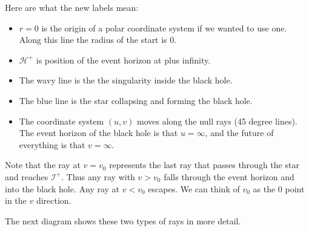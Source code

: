 \documentclass[12pt,border=3pt,tikz]{article}
\def\scri{\mathscr I}
\begin{document}
Here are what the new labels mean:

\begin{itemize}
\item $r=0$ is the origin of a polar coordinate system if we wanted to use one. Along this line the
radius of the start is $0$.
\item ${\mathcal H}^+$ is position of the event horizon at plus infinity.
\item The wavy line is the the singularity inside the black hole.
\item The blue line is the star collapsing and forming the black hole.
\item The coordinate system $(u,v)$ moves along the null rays (45 degree lines). The event
horizon of the black hole is that $u=\infty$, and the future of everything is that $v=\infty$.
\end{itemize}
\newpage
\noindent
Note that the ray at $v=v_0$  represents the last ray that passes through the star and reaches $\scri^+$.
Thus any ray with $v > v_0$ falls through the event horizon and into the black hole. Any ray at $v < v_0$
escapes. We can think of $v_0$ as the $0$ point in the $v$ direction.

The next diagram shows these two types of rays in more detail.
\end{document}
